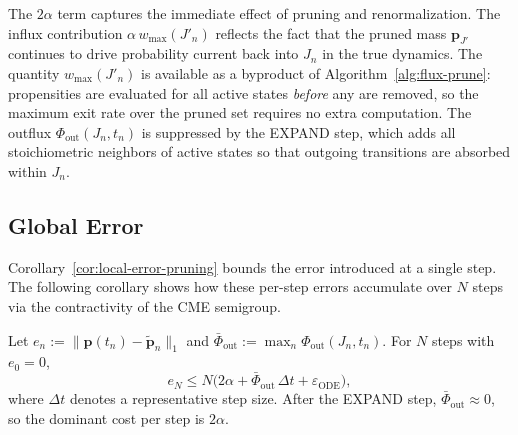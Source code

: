 \documentclass[onefignum,onetabnum]{siamart171218}
\begin{document}
The $2\alpha$ term captures the immediate effect of pruning and renormalization.  The influx contribution $\alpha\,w_{\max}(J'_n)$ reflects the fact that the pruned mass $\boldsymbol{p}_{J'}$ continues to drive probability current back into $J_n$ in the true dynamics.  The quantity $w_{\max}(J'_n)$ is available as a byproduct of Algorithm~\ref{alg:flux-prune}: propensities are evaluated for all active states \emph{before} any are removed, so the maximum exit rate over the pruned set requires no extra computation.  The outflux $\Phi_{\mathrm{out}}(J_n,t_n)$ is suppressed by the EXPAND step, which adds all stoichiometric neighbors of active states so that outgoing transitions are absorbed within $J_n$.

\subsection{Global Error}

Corollary~\ref{cor:local-error-pruning} bounds the error introduced at a single step.  The following corollary shows how these per-step errors accumulate over $N$ steps via the contractivity of the CME semigroup.

\begin{corollary}
\label{cor:global-error}
Let $e_n := \|\boldsymbol{p}(t_n) - \widetilde{\boldsymbol{p}}_n\|_1$ and $\bar{\Phi}_{\mathrm{out}} := \max_n \Phi_{\mathrm{out}}(J_n,t_n)$.  For $N$ steps with $e_0=0$,
\begin{equation}
\label{eq:global-error-bound}
e_N \leq N\bigl(2\alpha + \bar{\Phi}_{\mathrm{out}}\,\Delta t + \varepsilon_{\mathrm{ODE}}\bigr),
\end{equation}
where $\Delta t$ denotes a representative step size.  After the EXPAND step, $\bar{\Phi}_{\mathrm{out}} \approx 0$, so the dominant cost per step is $2\alpha$.
\end{corollary}
\end{document}
